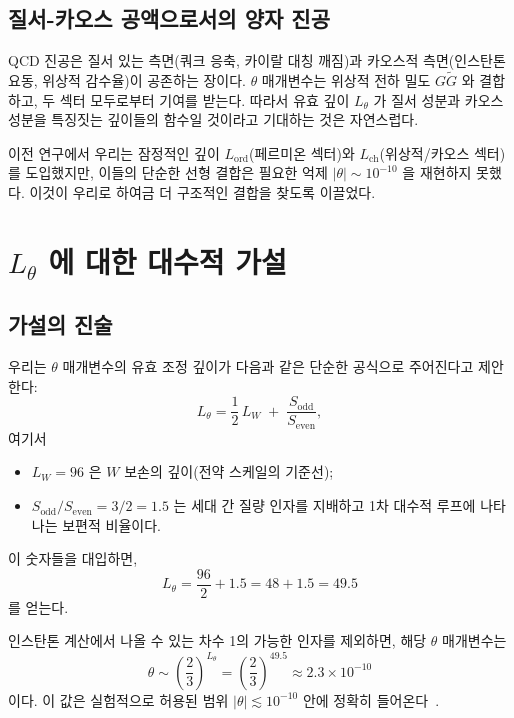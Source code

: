 \documentclass[11pt,a4paper]{article}
\begin{document}
	\subsection{질서-카오스 공액으로서의 양자 진공}
	QCD 진공은 질서 있는 측면(쿼크 응축, 카이랄 대칭 깨짐)과 카오스적 측면(인스탄톤 요동, 위상적 감수율)이 공존하는 장이다. \(\theta\) 매개변수는 위상적 전하 밀도 \(G\widetilde{G}\) 와 결합하고, 두 섹터 모두로부터 기여를 받는다. 따라서 유효 깊이 \(L_\theta\) 가 질서 성분과 카오스 성분을 특징짓는 깊이들의 함수일 것이라고 기대하는 것은 자연스럽다.
	
	이전 연구에서 우리는 잠정적인 깊이 \(L_{\mathrm{ord}}\)(페르미온 섹터)와 \(L_{\mathrm{ch}}\)(위상적/카오스 섹터)를 도입했지만, 이들의 단순한 선형 결합은 필요한 억제 \(|\theta| \sim 10^{-10}\) 을 재현하지 못했다. 이것이 우리로 하여금 더 구조적인 결합을 찾도록 이끌었다.
	
	\section{\(L_\theta\) 에 대한 대수적 가설}
	\label{sec:hypothesis}
	
	\subsection{가설의 진술}
	
	우리는 \(\theta\) 매개변수의 유효 조정 깊이가 다음과 같은 단순한 공식으로 주어진다고 제안한다:
	\begin{equation}
		\boxed{L_\theta = \frac{1}{2}\,L_W \;+\; \frac{S_{\mathrm{odd}}}{S_{\mathrm{even}}}},
		\label{eq:Ltheta}
	\end{equation}
	여기서
	\begin{itemize}
		\item \(L_W = 96\) 은 \(W\) 보손의 깊이(전약 스케일의 기준선);
		\item \(S_{\mathrm{odd}}/S_{\mathrm{even}} = 3/2 = 1.5\) 는 세대 간 질량 인자를 지배하고 1차 대수적 루프에 나타나는 보편적 비율이다.
	\end{itemize}
	
	이 숫자들을 대입하면,
	\[
	L_\theta = \frac{96}{2} + 1.5 = 48 + 1.5 = 49.5
	\]
	를 얻는다.
	
	인스탄톤 계산에서 나올 수 있는 차수 1의 가능한 인자를 제외하면, 해당 \(\theta\) 매개변수는
	\[
	\theta \sim \left(\frac{2}{3}\right)^{L_\theta} = \left(\frac{2}{3}\right)^{49.5} \approx 2.3 \times 10^{-10}
	\]
	이다. 이 값은 실험적으로 허용된 범위 \(|\theta| \lesssim 10^{-10}\) 안에 정확히 들어온다~\cite{nEDM2020}.
	
\end{document}
